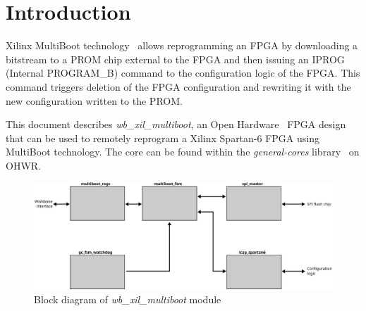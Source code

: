 \documentclass[a4paper,11pt]{article}
\begin{document}
\pagebreak
{}
\setcounter{page}{1}

\section{Introduction}
\label{sec:intro}

Xilinx MultiBoot technology~\cite{ug380} allows reprogramming an FPGA by downloading a
bitstream to a PROM chip external to the FPGA and then issuing an IPROG (Internal
PROGRAM\_B) command to the configuration logic of the FPGA. This command triggers
deletion of the FPGA configuration and rewriting it with the new configuration
written to the PROM.

This document describes \textit{wb\_xil\_multiboot}, an Open Hardware~\cite{ohwr}
FPGA design that can be used to remotely reprogram a Xilinx Spartan-6 FPGA using
MultiBoot technology. The core can be found within the \textit{general-cores}
library~\cite{gencores-ohwr} on OHWR.

\begin{figure}[h]
  \centerline{\includegraphics[width=\textwidth]{fig/multiboot-bd}}
  \label{fig:multiboot-bd}
  \caption{Block diagram of \textit{wb\_xil\_multiboot} module}
\end{figure}
\end{document}
